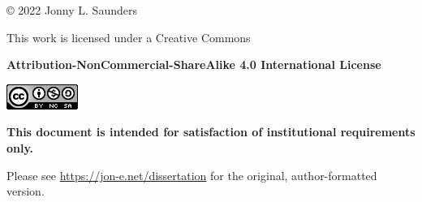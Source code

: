 \clearpage



\begin{centering}
\vspace*{2in}

© 2022 Jonny L. Saunders

This work is licensed under a Creative Commons

\textbf{Attribution-NonCommercial-ShareAlike 4.0 International License}
\begin{center}
\href{https://creativecommons.org/licenses/by-nc-sa/4.0/}{\includegraphics{prefatory/cc-license.png}}
\end{center}

\vspace{1.5in}

\textbf{This document is intended for satisfaction of institutional requirements only.}

\begin{center}
Please see \textcolor{black}{\url{https://jon-e.net/dissertation}} for the original, author-formatted version.
\end{center}
\end{centering}
